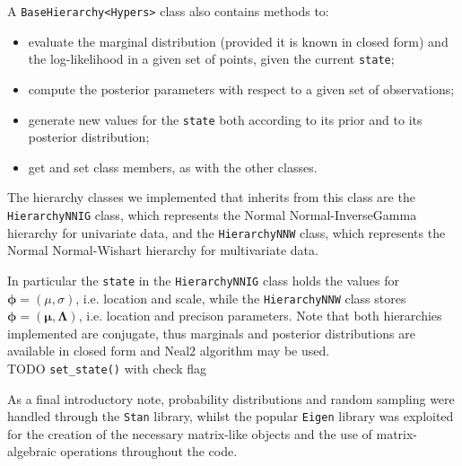 \begin{itemize}
	A \verb|BaseHierarchy<Hypers>| class also contains methods to:
	\begin{itemize}
		\item evaluate the marginal distribution (provided it is known in closed form) and the log-likelihood in a given set of points, given the current \verb|state|;
		\item compute the posterior parameters with respect to a given set of observations;
		\item generate new values for the \verb|state| both according to its prior and to its posterior distribution;
		\item get and set class members, as with the other classes.
	\end{itemize}


The hierarchy classes we implemented that inherits from this class are the \verb|HierarchyNNIG| class, which represents the Normal Normal-InverseGamma hierarchy for univariate data, and the \verb|HierarchyNNW| class, which represents the Normal Normal-Wishart hierarchy for multivariate data.

In particular the \verb|state| in the \verb|HierarchyNNIG| class holds the values for $\boldsymbol\phi = (\mu,\sigma)$, i.e.  location and scale, while the \verb|HierarchyNNW| class stores $\boldsymbol\phi = (\mathbf{\mu},\mathbf{\Lambda})$, i.e. location and precison parameters.
Note that both hierarchies implemented are conjugate, thus marginals and
posterior distributions are available in closed form and Neal2 algorithm may be used. \\
TODO \verb|set_state()| with check flag
	
\end{itemize}

As a final introductory note, probability distributions and random sampling were handled through the \verb|Stan| library, whilst the popular \verb|Eigen| library was exploited for the creation of the necessary matrix-like objects and the use of matrix-algebraic operations throughout the code.